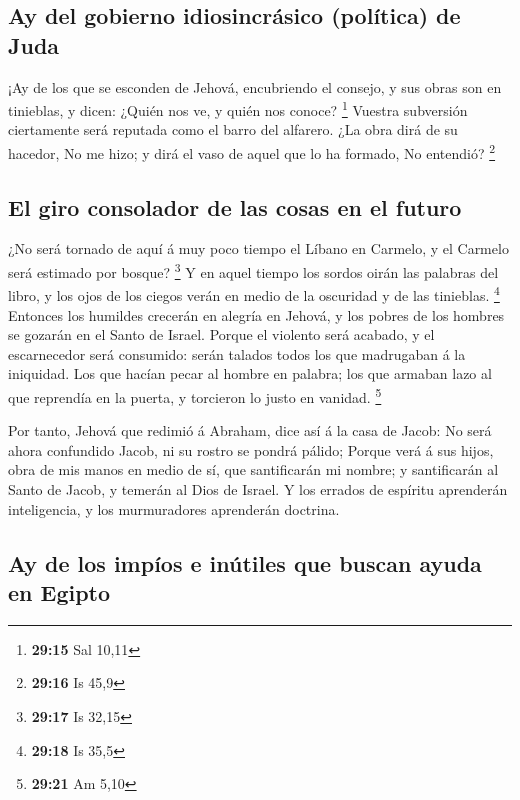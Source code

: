 \hypertarget{ay-del-gobierno-idiosincruxe1sico-poluxedtica-de-juda}{%
\subsection{Ay del gobierno idiosincrásico (política) de
Juda}\label{ay-del-gobierno-idiosincruxe1sico-poluxedtica-de-juda}}

 ¡Ay de los que se esconden de Jehová, encubriendo el
consejo, y sus obras son en tinieblas, y dicen: ¿Quién nos ve, y quién
nos conoce? \footnote{\textbf{29:15} Sal 10,11}  Vuestra
subversión ciertamente será reputada como el barro del alfarero. ¿La
obra dirá de su hacedor, No me hizo; y dirá el vaso de aquel que lo ha
formado, No entendió? \footnote{\textbf{29:16} Is 45,9}

\hypertarget{el-giro-consolador-de-las-cosas-en-el-futuro}{%
\subsection{El giro consolador de las cosas en el
futuro}\label{el-giro-consolador-de-las-cosas-en-el-futuro}}

 ¿No será tornado de aquí á muy poco tiempo el Líbano en
Carmelo, y el Carmelo será estimado por bosque? \footnote{\textbf{29:17}
  Is 32,15}  Y en aquel tiempo los sordos oirán las
palabras del libro, y los ojos de los ciegos verán en medio de la
oscuridad y de las tinieblas. \footnote{\textbf{29:18} Is 35,5}
 Entonces los humildes crecerán en alegría en Jehová, y
los pobres de los hombres se gozarán en el Santo de Israel.
 Porque el violento será acabado, y el escarnecedor será
consumido: serán talados todos los que madrugaban á la iniquidad.
 Los que hacían pecar al hombre en palabra; los que
armaban lazo al que reprendía en la puerta, y torcieron lo justo en
vanidad. \footnote{\textbf{29:21} Am 5,10}

 Por tanto, Jehová que redimió á Abraham, dice así á la
casa de Jacob: No será ahora confundido Jacob, ni su rostro se pondrá
pálido;  Porque verá á sus hijos, obra de mis manos en
medio de sí, que santificarán mi nombre; y santificarán al Santo de
Jacob, y temerán al Dios de Israel.  Y los errados de
espíritu aprenderán inteligencia, y los murmuradores aprenderán
doctrina.

\hypertarget{ay-de-los-impuxedos-e-inuxfatiles-que-buscan-ayuda-en-egipto}{%
\subsection{Ay de los impíos e inútiles que buscan ayuda en
Egipto}\label{ay-de-los-impuxedos-e-inuxfatiles-que-buscan-ayuda-en-egipto}}

